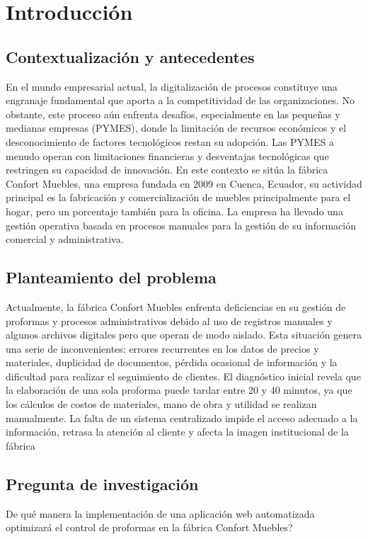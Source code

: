 \chapter*{Introducción}
\section*{Contextualización y antecedentes}

En el mundo empresarial actual, la digitalización de procesos constituye una engranaje fundamental que aporta a la competitividad de las organizaciones. No obstante, este proceso aún enfrenta desafíos, especialmente en las pequeñas y medianas empresas (PYMES), donde la limitación de recursos económicos y el desconocimiento de factores tecnológicos restan su adopción. Las PYMES a menudo operan con limitaciones financieras y desventajas tecnológicas que restringen su capacidad de innovación.
En este contexto se sitúa la fábrica Confort Muebles, una empresa fundada en 2009 en Cuenca, Ecuador, su actividad principal es la fabricación y comercialización de muebles principalmente para el hogar, pero un porcentaje también para la oficina. La empresa ha llevado una gestión operativa basada en procesos manuales para la gestión de su información comercial y administrativa.


\section*{Planteamiento del problema}
Actualmente, la fábrica Confort Muebles enfrenta deficiencias en su gestión de proformas y procesos administrativos debido al uso de registros manuales y algunos archivos digitales pero que operan de modo aislado. Esta situación genera una serie de inconvenientes: errores recurrentes en los datos de precios y materiales, duplicidad de documentos, pérdida ocasional de información y la dificultad para realizar el seguimiento de clientes.
El diagnóstico inicial revela que la elaboración de una sola proforma puede tardar entre 20 y 40 minutos, ya que los cálculos de costos de materiales, mano de obra y utilidad se realizan manualmente. La falta de un sistema centralizado impide el acceso adecuado a la información, retrasa la atención al cliente y afecta la imagen institucional de la fábrica


\section*{Pregunta de investigación}
De qué manera la implementación de una aplicación web automatizada optimizará el control de proformas en la fábrica Confort Muebles?

